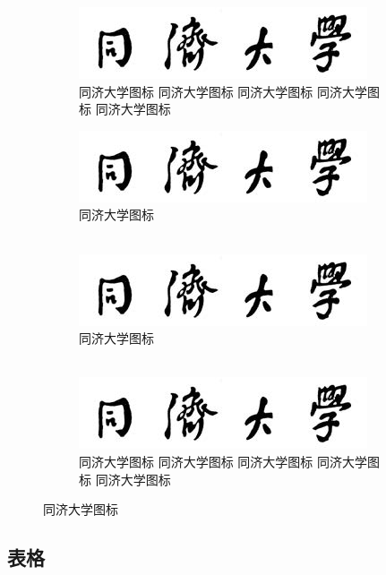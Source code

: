\begin{figure}[htbp]
  \hfil
  \begin{subfigure}[b]{0.4\textwidth}
    \centering
    \includegraphics{tongji-name-bacholar.jpg}
    \caption{同济大学图标 同济大学图标 同济大学图标 同济大学图标 同济大学图标}\label{fig:tjusub1}
  \end{subfigure}
  \hfil
  \begin{subfigure}[b]{0.4\textwidth}
    \centering
    \includegraphics{tongji-name-bacholar.jpg}
    \caption{同济大学图标\\~}
  \end{subfigure}
  \hfil

  \hfil
  \begin{subfigure}[b]{0.4\textwidth}
    \centering
    \includegraphics{tongji-name-bacholar.jpg}
    \caption{同济大学图标\\~}
  \end{subfigure}
  \hfil
  \begin{subfigure}[b]{0.4\textwidth}
    \centering
    \includegraphics{tongji-name-bacholar.jpg}
    \caption{同济大学图标 同济大学图标 同济大学图标 同济大学图标 同济大学图标}
  \end{subfigure}
  \hfil
  \caption{同济大学图标}\label{fig:tju}
\end{figure}

\zhlipsum[1]

\subsection{表格}

